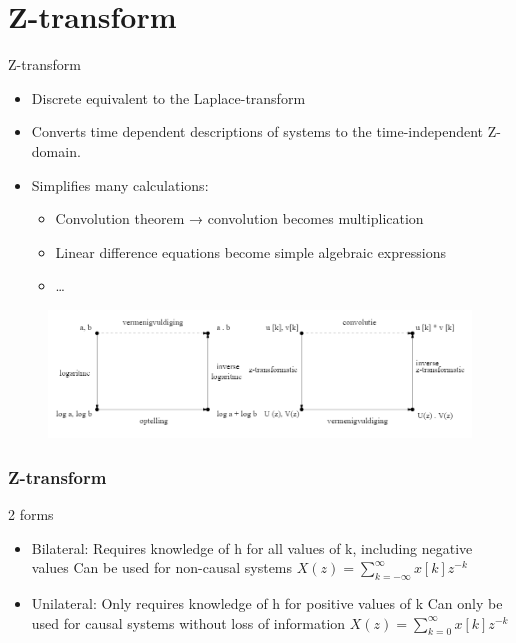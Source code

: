 \section{Z-transform}
\begin{frame}{Z-transform}
	\begin{definition}
		\begin{itemize}
			\item Discrete equivalent to the Laplace-transform
			\item Converts time dependent descriptions of systems to the time-independent Z-domain.
			\item Simplifies many calculations:
			\begin{itemize}
				\item 	Convolution theorem → convolution becomes multiplication
				\item Linear difference equations become simple algebraic expressions
				\item \dots
			\end{itemize}
		\end{itemize}
	
		
	\end{definition}
		\begin{figure}
			\centering
			\includegraphics[width=0.7\linewidth]{Images/discrete_time_systems_21}
			\caption{}
			\label{fig:discrete_time_systems_21}
		\end{figure}
		
\end{frame}
\begin{frame}
	\frametitle{Z-transform}
	\begin{block}{2 forms}
			\begin{itemize}
				
				\item Bilateral:
				Requires knowledge of h for all values of k, including negative values
				Can be used for non-causal systems $X(z) = \sum\limits_{k=-\infty}^{\infty} x[k]z^{-k}$
				\item 	Unilateral:
				Only requires knowledge of h for positive values of k
				Can only be used for causal systems without loss of information $X(z) = \sum\limits_{k=0}^{\infty} x[k]z^{-k}$
			\end{itemize}
	\end{block}


\end{frame}
